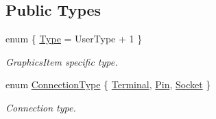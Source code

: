 \subsection*{Public Types}
\begin{DoxyCompactItemize}
\item 
enum \{ \hyperlink{classmdt_cl_path_graphics_connection_a44e9a0adc0eeb58723d564c163accd2fa9843d7f20edcdad949a8e3611ca47625}{Type} = User\-Type + 1
 \}
\begin{DoxyCompactList}\small\item\em Graphics\-Item specific type. \end{DoxyCompactList}\item 
enum \hyperlink{classmdt_cl_path_graphics_connection_af26f48d07af6395c5395d8078facb3a5}{Connection\-Type} \{ \hyperlink{classmdt_cl_path_graphics_connection_af26f48d07af6395c5395d8078facb3a5a3bd7f2546e9b1653f6e9b9ad3e079a6e}{Terminal}, 
\hyperlink{classmdt_cl_path_graphics_connection_af26f48d07af6395c5395d8078facb3a5a5e0126284fe1a9941c5a8dec39337ccf}{Pin}, 
\hyperlink{classmdt_cl_path_graphics_connection_af26f48d07af6395c5395d8078facb3a5adbf5ae12dbb4429f895c6a6bdb52c6bf}{Socket}
 \}
\begin{DoxyCompactList}\small\item\em Connection type. \end{DoxyCompactList}\end{DoxyCompactItemize}
